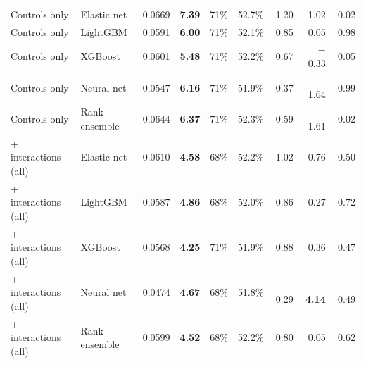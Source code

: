 \begin{tabular}{llrrrrrrr}
Controls only & Elastic net & 0.0669 & \textbf{7.39} & 71\% & 52.7\% & 1.20 & 1.02 & 0.02 \\
Controls only & LightGBM & 0.0591 & \textbf{6.00} & 71\% & 52.1\% & 0.85 & 0.05 & 0.98 \\
Controls only & XGBoost & 0.0601 & \textbf{5.48} & 71\% & 52.2\% & 0.67 & \ensuremath{-}0.33 & 0.05 \\
Controls only & Neural net & 0.0547 & \textbf{6.16} & 71\% & 51.9\% & 0.37 & \ensuremath{-}1.64 & 0.99 \\
Controls only & Rank ensemble & 0.0644 & \textbf{6.37} & 71\% & 52.3\% & 0.59 & \ensuremath{-}1.61 & 0.02 \\
+ interactions (all) & Elastic net & 0.0610 & \textbf{4.58} & 68\% & 52.2\% & 1.02 & 0.76 & 0.50 \\
+ interactions (all) & LightGBM & 0.0587 & \textbf{4.86} & 68\% & 52.0\% & 0.86 & 0.27 & 0.72 \\
+ interactions (all) & XGBoost & 0.0568 & \textbf{4.25} & 71\% & 51.9\% & 0.88 & 0.36 & 0.47 \\
+ interactions (all) & Neural net & 0.0474 & \textbf{4.67} & 68\% & 51.8\% & \ensuremath{-}0.29 & \textbf{\ensuremath{-}4.14} & \ensuremath{-}0.49 \\
+ interactions (all) & Rank ensemble & 0.0599 & \textbf{4.52} & 68\% & 52.2\% & 0.80 & 0.05 & 0.62 \\
\bottomrule
\end{tabular}
